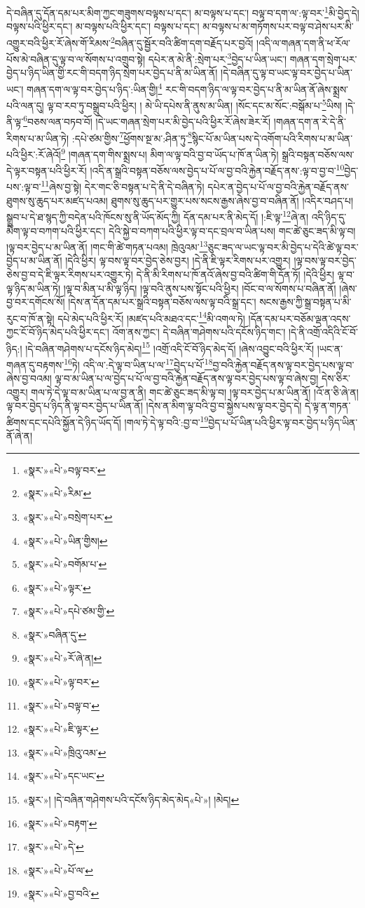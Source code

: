 དེ་བཞིན་དུ་དོན་དམ་པར་མིག་ཀྱང་གཟུགས་བལྟས་པ་དང་། མ་བལྟས་པ་དང་། བལྟ་བ་དག་ལ་:ལྟ་བར་\footnote{«སྣར་»«པེ་»བལྟ་བར་}མི་བྱེད་དེ། བལྟས་པའི་ཕྱིར་དང་། མ་བལྟས་པའི་ཕྱིར་དང་། བལྟས་པ་དང་། མ་བལྟས་པ་མ་གཏོགས་པར་བལྟ་བ་ཤེས་པར་མི་འགྱུར་བའི་ཕྱིར་རོ་ཞེས་གོ་རིམས་\footnote{«སྣར་»«པེ་»རིམ་}བཞིན་དུ་སྦྱོར་བའི་ཚིག་དག་བརྗོད་པར་བྱའོ། །འདི་ལ་གཞན་དག་ནི་ཕ་རོལ་པོས་མེ་བཞིན་དུ་ལྟ་བ་ལ་སོགས་པ་འགྲུབ་སྟེ། དཔེར་ན་མེ་ནི་:སྲེག་པར་\footnote{«སྣར་»«པེ་»བསྲེག་པར་}བྱེད་པ་ཡིན་ཡང་། གཞན་དག་སྲེག་པར་བྱེད་པ་ཉིད་ཡིན་གྱི་རང་གི་བདག་ཉིད་སྲེག་པར་བྱེད་པ་ནི་མ་ཡིན་ནོ། །དེ་བཞིན་དུ་ལྟ་བ་ཡང་ལྟ་བར་བྱེད་པ་ཡིན་ཡང་། གཞན་དག་ལ་ལྟ་བར་བྱེད་པ་ཉིད་:ཡིན་གྱི།\footnote{«སྣར་»«པེ་»ཡིན་གྱིས།} རང་གི་བདག་ཉིད་ལ་ལྟ་བར་བྱེད་པ་ནི་མ་ཡིན་ནོ་ཞེས་སྨྲས་པའི་ལན་དུ། ལྟ་བ་རབ་ཏུ་བསྒྲུབ་པའི་ཕྱིར། །
མེ་ཡི་དཔེས་ནི་ནུས་མ་ཡིན། །སོང་དང་མ་སོང་:བསྒོམ་པ་\footnote{«སྣར་»«པེ་»བགོམ་པ་}ཡིས། །དེ་ནི་ལྟ་\footnote{«སྣར་»«པེ་»ལྟར་}བཅས་ལན་བཏབ་བོ། །དེ་ཡང་གཞན་སྲེག་པར་མི་བྱེད་པའི་ཕྱིར་རོ་ཞེས་ཟེར་རོ། །གཞན་དག་ན་རེ་དེ་ནི་རིགས་པ་མ་ཡིན་ཏེ། :དཔེ་ཙམ་གྱིས་\footnote{«སྣར་»«པེ་»དཔེ་ཙམ་གྱི་}ཕྱོགས་སྔ་མ་:ཤིན་ཏུ་\footnote{«སྣར་»བཞིན་དུ་}སྙིང་པོ་མ་ཡིན་པས་དེ་འགོག་པའི་རིགས་པ་མ་ཡིན་པའི་ཕྱིར་:རོ་ཞེའོ།\footnote{«སྣར་»«པེ་»རོ་ཞེ་ན།} །གཞན་དག་གིས་སྨྲས་པ། མིག་ལ་ལྟ་བའི་བྱ་བ་ཡོད་པ་ཁོ་ན་ཡིན་ཏེ། སྒྲའི་བསྟན་བཅོས་ལས་དེ་ལྟར་བསྟན་པའི་ཕྱིར་རོ། །འདི་ན་སྒྲའི་བསྟན་བཅོས་ལས་བྱེད་པ་པོ་ལ་བྱ་བའི་རྐྱེན་བརྗོད་ནས་:ལྟ་བ་བྱ་བ་\footnote{«སྣར་»«པེ་»ལྟ་བར་}བྱེད་པས་:ལྟ་བ་\footnote{«སྣར་»«པེ་»བལྟ་བ་}ཞེས་བྱ་སྟེ། དེར་གང་ཅི་བསྟན་པ་དེ་ནི་དེ་བཞིན་ཏེ། དཔེར་ན་བྱེད་པ་པོ་ལ་བྱ་བའི་རྐྱེན་བརྗོད་ནས་ཐུགས་སུ་ཆུད་པར་མཛད་པའམ། ཐུགས་སུ་ཆུད་པར་གྱུར་པས་སངས་རྒྱས་ཞེས་བྱ་བ་བཞིན་ནོ། །འདིར་བཤད་པ། སྒྲུབ་པ་དེ་ཐ་སྙད་ཀྱི་བདེན་པའི་ཁོངས་སུ་ནི་ཡོད་མོད་ཀྱི། དོན་དམ་པར་ནི་མེད་དོ། །:ཇི་ལྟ་\footnote{«སྣར་»«པེ་»ཇི་ལྟར་}ཞེ་ན། འདི་ཉིད་དུ་མིག་ལྟ་བ་བཀག་པའི་ཕྱིར་དང་། དེའི་སྐྱེ་བ་བཀག་པའི་ཕྱིར་ལྟ་བ་དང་བྲལ་བ་ཡིན་པས། གང་ཚེ་ཅུང་ཟད་མི་ལྟ་བ། །ལྟ་བར་བྱེད་པ་མ་ཡིན་ནོ། །གང་གི་ཚེ་གཏན་པའམ། ཁྲེའུའམ་\footnote{«སྣར་»«པེ་»ཁྲིའུ་འམ་}ཅུང་ཟད་ལ་ཡང་ལྟ་བར་མི་བྱེད་པ་དེའི་ཚེ་ལྟ་བར་བྱེད་པ་མ་ཡིན་ནོ། །དེའི་ཕྱིར། ལྟ་བས་ལྟ་བར་བྱེད་ཅེས་བྱར། །དེ་ནི་ཇི་ལྟར་རིགས་པར་འགྱུར། །ལྟ་བས་ལྟ་བར་བྱེད་ཅེས་བྱ་བ་དེ་ཇི་ལྟར་རིགས་པར་འགྱུར་ཏེ། དེ་ནི་མི་རིགས་པ་ཁོ་ནའོ་ཞེས་བྱ་བའི་ཚིག་གི་དོན་ཏོ། །དེའི་ཕྱིར། ལྟ་བ་ལྟ་ཉིད་མ་ཡིན་ཏེ། །ལྟ་བ་མིན་པ་མི་ལྟ་ཉིད། །ལྟ་བའི་ནུས་པས་སྟོང་པའི་ཕྱིར། །བོང་བ་ལ་སོགས་པ་བཞིན་ནོ། །ཞེས་བྱ་བར་དགོངས་སོ། །དེས་ན་དོན་དམ་པར་སྒྲའི་བསྟན་བཅོས་ལས་ལྟ་བའི་སྒྲ་དང་། སངས་རྒྱས་ཀྱི་སྒྲ་བསྟན་པ་མི་རུང་བ་ཁོ་ན་སྟེ། དཔེ་མེད་པའི་ཕྱིར་རོ། །མཛད་པའི་མཐའ་དང་\footnote{«སྣར་»«པེ་»དང་ཡང་}མི་འགལ་ཏེ། །དོན་དམ་པར་བཅོམ་ལྡན་འདས་ཀྱང་ངོ་བོ་ཉིད་མེད་པའི་ཕྱིར་དང་། འོག་ནས་ཀྱང་། དེ་བཞིན་གཤེགས་པའི་དངོས་ཉིད་གང་། །དེ་ནི་འགྲོ་འདིའི་ངོ་བོ་ཉིད:། །དེ་བཞིན་གཤེགས་པ་དངོས་ཉིད་མེད།\footnote{«སྣར་»། །དེ་བཞིན་གཤེགས་པའི་དངོས་ཉིད་མེད་མེད«པེ་»། །མེད།} །འགྲོ་འདི་ངོ་བོ་ཉིད་མེད་དོ། །ཞེས་འབྱུང་བའི་ཕྱིར་རོ། །ཡང་ན་གཞན་དུ་བརྟགས་\footnote{«སྣར་»«པེ་»བརྟག་}ཏེ། འདི་ལ་:དེ་ལྟ་བ་ཡིན་པ་ལ་\footnote{«སྣར་»«པེ་»དེ་}བྱེད་པ་པོ་\footnote{«སྣར་»«པེ་»པོ་ལ་}བྱ་བའི་རྐྱེན་བརྗོད་ནས་ལྟ་བར་བྱེད་པས་ལྟ་བ་ཞེས་བྱ་བའམ། ལྟ་བ་མ་ཡིན་པ་ལ་བྱེད་པ་པོ་ལ་བྱ་བའི་རྐྱེན་བརྗོད་ནས་ལྟ་བར་བྱེད་པས་ལྟ་བ་ཞེས་བྱ། དེས་ཅིར་འགྱུར། གལ་ཏེ་དེ་ལྟ་བ་མ་ཡིན་པ་ལ་བྱ་ན་ནི། གང་ཚེ་ཅུང་ཟད་མི་ལྟ་བ། །ལྟ་བར་བྱེད་པ་མ་ཡིན་ནོ། །འོ་ན་ཅི་ཞེ་ན། ལྟ་བར་བྱེད་པ་ཉིད་ནི་ལྟ་བར་བྱེད་པ་ཡིན་ནོ། །དེས་ན་མིག་ལྟ་བའི་བྱ་བ་སྐྱེས་པས་ལྟ་བར་བྱེད་དེ། དེ་ལྟ་ན་གཏན་ཚིགས་དང་དཔེའི་སྐྱོན་དེ་ཉིད་ཡོད་དོ། །གལ་ཏེ་དེ་ལྟ་བའི་:བྱ་བ་\footnote{«སྣར་»«པེ་»བྱ་བའི་}བྱེད་པ་པོ་ཡིན་པའི་ཕྱིར་ལྟ་བར་བྱེད་པ་ཉིད་ཡིན་ནོ་ཞེ་ན། 